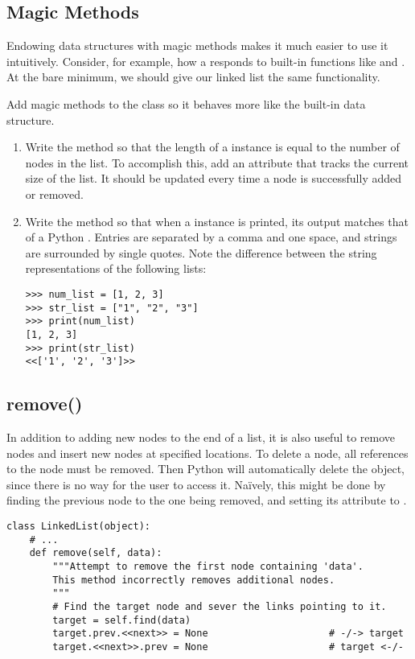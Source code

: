 \subsection*{Magic Methods}

Endowing data structures with magic methods makes it much easier to use it intuitively.
Consider, for example, how a  responds to built-in functions like  and .
At the bare minimum, we should give our linked list the same functionality.

\begin{problem}
Add magic methods to the  class so it behaves more like the built-in  data structure.
\begin{enumerate}
\item Write the  method so that the length of a  instance is equal to the number of nodes in the list. To accomplish this, add an attribute that tracks the current size of the list. It should be updated every time a node is successfully added or removed.
\item Write the  method so that when a  instance is printed, its output matches that of a Python . Entries are separated by a comma and one space, and strings are surrounded by single quotes. Note the difference between the string representations of the following lists:
\begin{lstlisting}
>>> num_list = [1, 2, 3]
>>> str_list = ["1", "2", "3"]
>>> print(num_list)
[1, 2, 3]
>>> print(str_list)
<<['1', '2', '3']>>
\end{lstlisting}
\end{enumerate}
\end{problem}

\subsection*{remove()}

In addition to adding new nodes to the end of a list, it is also useful to remove nodes and insert new nodes at specified locations.
To delete a node, all references to the node must be removed.
Then Python will automatically delete the object, since there is no way for the user to access it.
Na{\"i}vely, this might be done by finding the previous node to the one being removed, and setting its  attribute to .

\begin{lstlisting}
class LinkedList(object):
    # ...
    def remove(self, data):
        """Attempt to remove the first node containing 'data'.
        This method incorrectly removes additional nodes.
        """
        # Find the target node and sever the links pointing to it.
        target = self.find(data)
        target.prev.<<next>> = None                     # -/-> target
        target.<<next>>.prev = None                     # target <-/-
\end{lstlisting}

